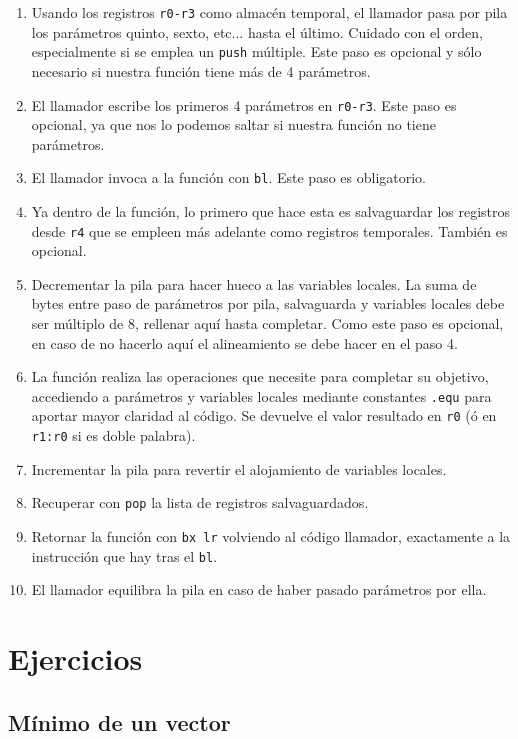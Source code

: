 \begin{enumerate}
  \item Usando los registros {\tt r0-r3} como almacén temporal, el llamador pasa por pila
        los parámetros quinto, sexto, etc... hasta el último. Cuidado con el orden,
        especialmente si se emplea un {\tt push} múltiple. Este paso es opcional y sólo
        necesario si nuestra función tiene más de 4 parámetros.
  \item El llamador escribe los primeros 4 parámetros en {\tt r0-r3}. Este paso es opcional,
        ya que nos lo podemos saltar si nuestra función no tiene parámetros.
  \item El llamador invoca a la función con {\tt bl}. Este paso es obligatorio.
  \item Ya dentro de la función, lo primero que hace esta es salvaguardar los registros
        desde {\tt r4} que se empleen más adelante como registros temporales. También es opcional.
  \item Decrementar la pila para hacer hueco a las variables locales. La suma de bytes
        entre paso de parámetros por pila, salvaguarda y variables locales debe ser
        múltiplo de 8, rellenar aquí hasta completar. Como este paso es opcional, en caso
        de no hacerlo aquí el alineamiento se debe hacer en el paso 4.
  \item La función realiza las operaciones que necesite para completar su objetivo, accediendo
        a parámetros y variables locales mediante constantes {\tt .equ} para aportar mayor claridad
        al código. Se devuelve el valor resultado en {\tt r0} (ó en {\tt r1:r0} si es doble
        palabra).
  \item Incrementar la pila para revertir el alojamiento de variables locales.
  \item Recuperar con {\tt pop} la lista de registros salvaguardados.
  \item Retornar la función con {\tt bx lr} volviendo al código llamador, exactamente a la
        instrucción que hay tras el {\tt bl}. 
  \item El llamador equilibra la pila en caso de haber pasado parámetros por ella.
\end{enumerate}

\section{Ejercicios}

\subsection{Mínimo de un vector}

